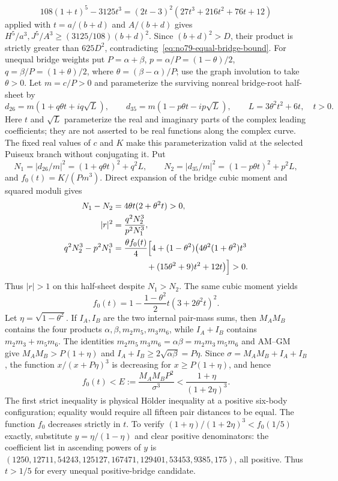 \documentclass[11pt]{amsart}
\theoremstyle{remark}
\begin{document}
\begin{equation}\label{eq:no79-mass-identity}
108(1+t)^5-3125t^3=(2t-3)^2(27t^3+216t^2+76t+12)
\end{equation}
applied with $t=a/(b+d)$ and $A/(b+d)$ gives $H^5/a^3,J^5/A^3\ge(3125/108)(b+d)^2$. Since $(b+d)^2>D$, their product is strictly greater than $625D^2$, contradicting~\eqref{eq:no79-equal-bridge-bound}.
For unequal bridge weights put $P=\alpha+\beta$, $p=\alpha/P=(1-\theta)/2$, $q=\beta/P=(1+\theta)/2$, where $\theta=(\beta-\alpha)/P$; use the graph involution to take $\theta>0$. Let $m=c/P>0$ and parameterize the surviving nonreal bridge-root half-sheet by
\[
d_{26}=m(1+q\theta t+iq\sqrt L),\qquad d_{35}=m(1-p\theta t-ip\sqrt L),\qquad L=3\theta^2t^2+6t,\quad t>0.
\]
Here $t$ and $\sqrt L$ parameterize the real and imaginary parts of the complex leading coefficients; they are not asserted to be real functions along the complex curve. The fixed real values of $c$ and $K$ make this parameterization valid at the selected Puiseux branch without conjugating it. Put
\[
N_1=|d_{26}/m|^2=(1+q\theta t)^2+q^2L,\qquad
N_2=|d_{35}/m|^2=(1-p\theta t)^2+p^2L,
\]
and $f_0(t)=K/(Pm^3)$. Direct expansion of the bridge cubic moment and squared moduli gives
\[
\begin{aligned}
N_1-N_2&=4\theta t(2+\theta^2t)>0,\\
|r|^2&=\frac{q^2N_2^3}{p^2N_1^3},\\
q^2N_2^3-p^2N_1^3
&=\frac{\theta f_0(t)}4\Bigl[4+(1-\theta^2)\bigl(4\theta^2(1+\theta^2)t^3\\
&\qquad\qquad +(15\theta^2+9)t^2+12t\bigr)\Bigr]>0.
\end{aligned}
\]
Thus $|r|>1$ on this half-sheet despite $N_1>N_2$. The same cubic moment yields
\[
f_0(t)=1-\frac{1-\theta^2}{2}t(3+2\theta^2t)^2.
\]
Let $\eta=\sqrt{1-\theta^2}$. If $I_A,I_B$ are the two internal pair-mass sums, then $M_AM_B$ contains the four products $\alpha,\beta,m_2m_5,m_3m_6$, while $I_A+I_B$ contains $m_2m_3+m_5m_6$. The identities $m_2m_5\,m_3m_6=\alpha\beta=m_2m_3\,m_5m_6$ and AM--GM give $M_AM_B>P(1+\eta)$ and $I_A+I_B\ge2\sqrt{\alpha\beta}=P\eta$. Since $\sigma=M_AM_B+I_A+I_B$, the function $x/(x+P\eta)^3$ is decreasing for $x\ge P(1+\eta)$, and hence
\[
f_0(t)<E:=\frac{M_AM_BP^2}{\sigma^3}<\frac{1+\eta}{(1+2\eta)^3}.
\]
The first strict inequality is physical H\"older inequality at a positive six-body configuration; equality would require all fifteen pair distances to be equal. The function $f_0$ decreases strictly in $t$. To verify $(1+\eta)/(1+2\eta)^3<f_0(1/5)$ exactly, substitute $y=\eta/(1-\eta)$ and clear positive denominators: the coefficient list in ascending powers of $y$ is $(1250,12711,54243,125127,167471,129401,53453,9385,175)$, all positive. Thus $t>1/5$ for every unequal positive-bridge candidate.
\end{document}
